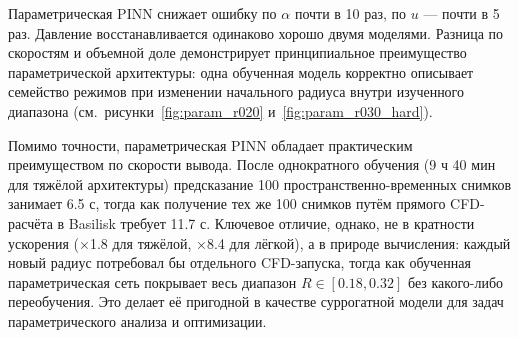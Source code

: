 Параметрическая PINN снижает ошибку по \(\alpha\) почти в 10 раз, по \(u\) ---
почти в 5 раз. Давление восстанавливается одинаково хорошо двумя моделями.
Разница по скоростям и объемной доле демонстрирует принципиальное преимущество
параметрической архитектуры: одна обученная модель корректно описывает семейство
режимов при изменении начального радиуса внутри изученного диапазона
(см.~рисунки~\ref{fig:param_r020} и~\ref{fig:param_r030_hard}).

Помимо точности, параметрическая PINN обладает практическим преимуществом по
скорости вывода. После однократного обучения (9 ч 40 мин для тяжёлой архитектуры) предсказание
100 пространственно-временных снимков занимает 6.5 с, тогда как получение тех
же 100 снимков путём прямого CFD-расчёта в Basilisk требует 11.7 с. Ключевое
отличие, однако, не в кратности ускорения (×1.8 для тяжёлой, ×8.4 для лёгкой), а в
природе вычисления: каждый новый радиус потребовал бы отдельного CFD-запуска,
тогда как обученная параметрическая сеть покрывает весь диапазон
$R \in [0.18, 0.32]$ без какого-либо переобучения. Это делает её пригодной в
качестве суррогатной модели для задач параметрического анализа и оптимизации.
